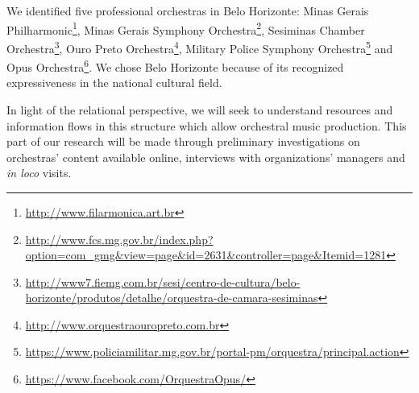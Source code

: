 \documentclass[a4paper, 12pt, openright, oneside, german, french, brazil, english]{abntex2}
\begin{document}
	
	
	We identified five professional orchestras in Belo Horizonte: Minas Gerais Philharmonic\footnote{\url{http://www.filarmonica.art.br}}, Minas Gerais Symphony Orchestra\footnote{\url{http://www.fcs.mg.gov.br/index.php?option=com_gmg&view=page&id=2631&controller=page&Itemid=1281}}, Sesiminas Chamber Orchestra\footnote{\url{http://www7.fiemg.com.br/sesi/centro-de-cultura/belo-horizonte/produtos/detalhe/orquestra-de-camara-sesiminas}}, Ouro Preto Orchestra\footnote{\url{http://www.orquestraouropreto.com.br}}, Military Police Symphony Orchestra\footnote{\url{https://www.policiamilitar.mg.gov.br/portal-pm/orquestra/principal.action}} and Opus Orchestra\footnote{\url{https://www.facebook.com/OrquestraOpus/}}. We chose	Belo Horizonte because of its recognized expressiveness in the national cultural field.
	
	
	In light of the relational perspective, we will seek to understand resources and information flows in this structure which allow orchestral music production. This part of our research will be made through preliminary investigations on orchestras' content available online, interviews with organizations' managers and \textit{in loco} visits.
	
\end{document}
